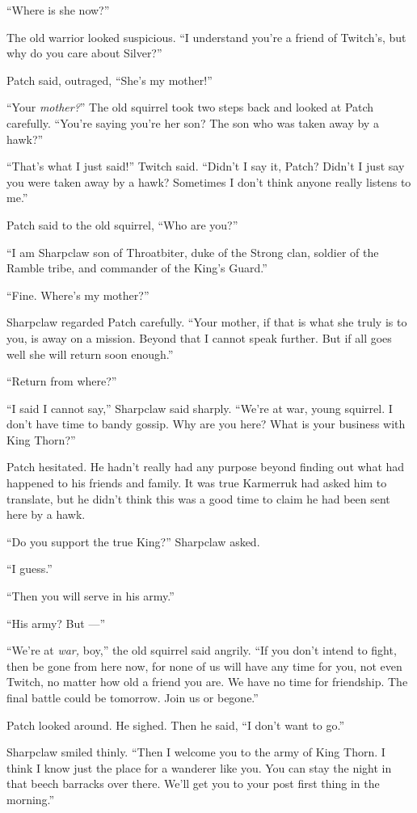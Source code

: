 \documentclass[ebook,oneside,openany,17pt]{memoir}
\begin{document}
“Where is she now?”

The old warrior looked suspicious. “I understand you’re a friend of
Twitch’s, but why do you care about Silver?”

Patch said, outraged, “She’s my mother!”

“Your \emph{mother?}” The old squirrel took two steps back and
looked at Patch carefully. “You’re saying you’re her son? The son who
was taken away by a hawk?”

“That’s what I just said!” Twitch said. “Didn’t I say it, Patch?
Didn’t I just say you were taken away by a hawk? Sometimes I don’t
think anyone really listens to me.”

Patch said to the old squirrel, “Who are you?”

“I am Sharpclaw son of Throatbiter, duke of the Strong clan, soldier
of the Ramble tribe, and commander of the King’s Guard.”

“Fine. Where’s my mother?”

Sharpclaw regarded Patch carefully. “Your mother, if that is what she
truly is to you, is away on a mission. Beyond that I cannot speak
further. But if all goes well she will return soon enough.”

“Return from where?”

“I said I cannot say,” Sharpclaw said sharply. “We’re at war, young
squirrel. I don’t have time to bandy gossip. Why are you here? What is
your business with King Thorn?”

Patch hesitated. He hadn’t really had any purpose beyond finding out
what had happened to his friends and family. It was true Karmerruk had
asked him to translate, but he didn’t think this was a good time to
claim he had been sent here by a hawk.

“Do you support the true King?” Sharpclaw asked.

“I guess.”

“Then you will serve in his army.”

“His army? But —”

“We’re at \emph{war,} boy,” the old squirrel said angrily. “If you
don’t intend to fight, then be gone from here now, for none of us will
have any time for you, not even Twitch, no matter how old a friend you
are. We have no time for friendship. The final battle could be
tomorrow. Join us or begone.”

Patch looked around. He sighed. Then he said, “I don’t want to go.”

Sharpclaw smiled thinly. “Then I welcome you to the army of King
Thorn. I think I know just the place for a wanderer like you. You can
stay the night in that beech barracks over there. We’ll get you to
your post first thing in the morning.”
\end{document}
